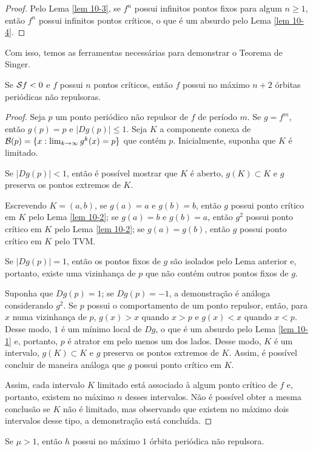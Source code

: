 \begin{proof}
Pelo Lema \ref{lem 10-3}, se $f^n$ possui infinitos pontos fixos para algum $n \geq 1$, então $f^n$ possui infinitos pontos críticos, o que é um absurdo pelo Lema \ref{lem 10-4}.
\end{proof}

Com isso, temos as ferramentas necessárias para demonstrar o Teorema de Singer.

\begin{theorem}[Singer]
Se $\mathcal{S} f < 0$ e $f$ possui $n$ pontos críticos, então $f$ possui no máximo $n+2$ órbitas periódicas não repulsoras.
\end{theorem}

\begin{proof}
Seja $p$ um ponto periódico não repulsor de $f$ de período $m$.
Se $g = f^m$, então $g(p) = p$ e $|D g(p)| \leq 1$.
Seja $K$ a componente conexa de $\mathcal{B}(p) = \lbrace x : \lim_{k \to \infty} g^k(x) = p \rbrace$ que contém $p$.
Inicialmente, suponha que $K$ é limitado.

Se $|D g(p)| < 1$, então é possível mostrar que $K$ é aberto, $g(K) \subset K$ e $g$ preserva os pontos extremos de $K$.

Escrevendo $K = (a, b)$, se $g(a) = a$ e $g(b) = b$, então $g$ possui ponto crítico em $K$ pelo Lema \ref{lem 10-2}; se $g(a) = b$ e $g(b) = a$, então $g^2$ possui ponto crítico em $K$ pelo Lema \ref{lem 10-2}; se $g(a) = g(b)$, então $g$ possui ponto crítico em $K$ pelo TVM.

Se $|D g(p)| = 1$, então os pontos fixos de $g$ são isolados pelo Lema anterior e, portanto, existe uma vizinhança de $p$ que não contém outros pontos fixos de $g$.

Suponha que $D g(p) = 1$; se $D g(p) = -1$, a demonstração é análoga considerando $g^2$.
Se $p$ possui o comportamento de um ponto repulsor, então, para $x$ numa vizinhança de $p$, $g(x) > x$ quando $x > p$ e $g(x) < x$ quando $x < p$.
Desse modo, $1$ é um mínimo local de $D g$, o que é um absurdo pelo Lema \ref{lem 10-1} e, portanto, $p$ é atrator em pelo menos um dos lados.
Desse modo, $K$ é um intervalo, $g(K) \subset K$ e $g$ preserva os pontos extremos de $K$.
Assim, é possível concluir de maneira análoga que $g$ possui ponto crítico em $K$.

Assim, cada intervalo $K$ limitado está associado à algum ponto crítico de $f$ e, portanto, existem no máximo $n$ desses intervalos.
Não é possível obter a mesma conclusão se $K$ não é limitado, mas observando que existem no máximo dois intervalos desse tipo, a demonstração está concluída.
\end{proof}

\begin{corollary}
Se $\mu > 1$, então $h$ possui no máximo $1$ órbita periódica não repulsora.
\end{corollary}
